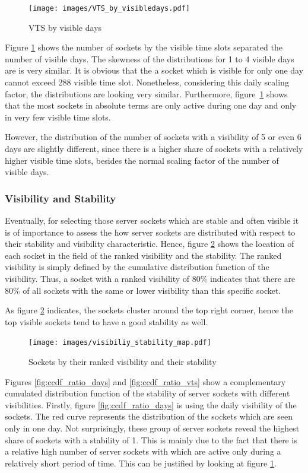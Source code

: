\begin{figure}
	[hb] \centering 
	\texttt{[image: images/VTS\_by\_visibledays.pdf]}
	\caption{VTS by visible days} 
	\label{fig:vts_by_visibledays} 
\end{figure}

Figure \ref{fig:vts_by_visibledays} shows the number of sockets by the visible time slots separated the number of visible days. The skewness of the 
distributions for 1 to 4 visible days are is very similar. It is obvious that 
the a socket which is visible for only one day cannot exceed 288 visible time 
slot. Nonetheless, considering this daily scaling factor, the distributions are 
looking very similar. Furthermore, figure \ref{fig:vts_by_visibledays} shows 
that the most sockets in absolute terms are only active during one day and only 
in very few visible time slots. 

However, the distribution of the number of sockets with a visibility of 5 or 
even 6 days are slightly different, since there is a higher share of sockets 
with a relatively higher visible time slots, besides the normal scaling factor 
of the number of visible days.

\subsubsection{Visibility and Stability}
Eventually, for selecting those server sockets which are stable and often visible it is of importance to assess the how server sockets are distributed with respect to their stability and visibility characteristic. Hence, figure \ref{fig:rankedVisibility} shows the location of each socket in the field of the ranked visibility and the stability. The ranked visibility is simply defined by the cumulative distribution function of the visibility. Thus, a socket with a ranked visibility of 80\% indicates that there are 80\% of all sockets with the same or lower visibility than this specific socket. 

As figure \ref{fig:rankedVisibility} indicates, the sockets cluster around the top right corner, hence the top visible sockets tend to have a good stability as well.

\begin{figure}
	[hb] \centering 
	\texttt{[image: images/visibiliy\_stability\_map.pdf]}
	\caption{Sockets by their ranked visibility and their stability} 
	\label{fig:rankedVisibility} 
\end{figure}


Figures \ref{fig:ccdf_ratio_days} and \ref{fig:ccdf_ratio_vts} show a 
complementary cumulated distribution function of the stability of server sockets 
with different visibilities. Firstly, figure \ref{fig:ccdf_ratio_days} is using 
the daily visibility of the sockets. The red curve represents the distribution 
of the sockets which are seen only in one day. Not surprisingly, these group of 
server sockets reveal the highest share of sockets with a stability of 1. This 
is mainly due to the fact that there is a relative high number of server sockets 
with which are active only during a relatively short period of time. This can be 
justified by looking at figure \ref{fig:vts_by_visibledays}.


